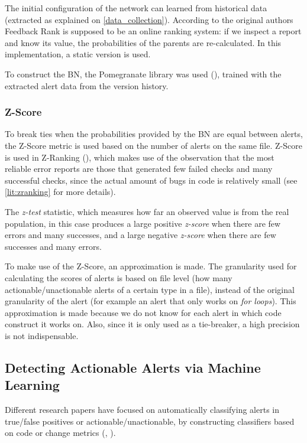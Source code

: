 The initial configuration of the network can learned from historical data (extracted as explained on \cref{data_collection}). According to the original authors Feedback Rank is supposed to be an online ranking system: if we inspect a report and know its value, the probabilities of the parents are re-calculated. In this implementation, a static version is used.

To construct the BN, the Pomegranate library was used (\cite{pomegranate}), trained with the extracted alert data from the version history.

\subsubsection{Z-Score}
To break ties when the probabilities provided by the BN are equal between alerts, the Z-Score metric is used based on the number of alerts on the same file. Z-Score is used in Z-Ranking (\cite{z-ranking}), which makes use of the observation that the most reliable error reports are those that generated few failed checks and many successful checks, since the actual amount of bugs in code is relatively small (see \cref{lit:zranking} for more details). 

The \textit{z-test} statistic, which measures how far an observed value is from the real population, in this case produces a large positive \textit{z-score} when there are few errors and many successes, and a large negative \textit{z-score} when there are few successes and many errors.

To make use of the Z-Score, an approximation is made. The granularity used for calculating the scores of alerts is based on file level (how many actionable/unactionable alerts of a certain type in a file), instead of the original granularity of the alert (for example an alert that only works on \textit{for loops}). This approximation is made because we do not know for each alert in which code construct it works on. Also, since it is only used as a tie-breaker, a high precision is not indispensable.

\subsection{Detecting Actionable Alerts via Machine Learning}

Different research papers have focused on automatically classifying alerts in true/false positives or actionable/unactionable, by constructing classifiers based on code or change metrics (\cite{actionable_sa}, \cite{model_building_actionable}).

